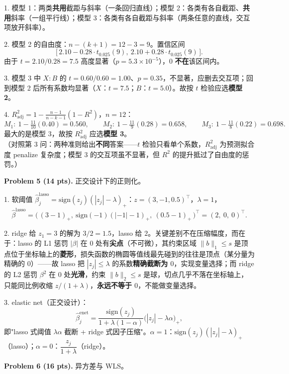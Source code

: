 \documentclass[11pt]{ctexart}
\newcommand{\ans}[1]{{\color{red}#1}}
\begin{document}
\ans{
1. 模型 1：两类\textbf{共用}截距与斜率（一条回归直线）；模型 2：各类有各自截距、\textbf{共用}斜率（一组平行线）；模型 3：各类有各自截距与斜率（两条任意的直线，交互项放开斜率）。

2. 模型 2 的自由度：$n - (k+1) = 12 - 3 = 9$。置信区间
\[
\big[\,2.10 - 0.28 \cdot t_{0.025}(9),\ 2.10 + 0.28 \cdot t_{0.025}(9)\,\big].
\]
由于 $t = 2.10/0.28 = 7.5$ 高度显著（$p = 5.3\times 10^{-5}$），$0$ \textbf{不在}该区间内。

3. 模型 3 中 $X{:}B$ 的 $t = 0.60/0.60 = 1.00$、$p = 0.35$，不显著，应删去交互项；回到模型 2 后所有系数均显著（$X$：$t=7.5$；$B$：$t=5.0$）。故按 $t$ 检验应选\textbf{模型 2}。

4. $R^2_{\mathrm{adj}} = 1 - \frac{n-1}{n-k-1}(1-R^2)$，$n = 12$：
\[
M_1:\ 1 - \tfrac{11}{10}(0.40) = 0.560, \qquad M_2:\ 1 - \tfrac{11}{9}(0.28) = 0.658, \qquad M_3:\ 1 - \tfrac{11}{8}(0.22) = 0.698.
\]
最大的是模型 3，故按 $R^2_{\mathrm{adj}}$ 应选\textbf{模型 3}。\\
（对照第 3 问：两种准则给出\textbf{不同}答案——$t$ 检验只看单个系数，$R^2_{\mathrm{adj}}$ 为预测拟合度 penalize 复杂度；模型 3 的交互项虽不显著，但 $R^2$ 的提升抵过了自由度的惩罚。）
}

\noindent\textbf{Problem 5 (14 pts).} 正交设计下的正则化。

\ans{
1. 软阈值 $\hat\beta_j^{\mathrm{lasso}} = \mathrm{sign}(z_j)(|z_j| - \lambda)_+$：$z = (3, -1, 0.5)^{\top}$，$\lambda = 1$，
\[
\hat\beta^{\mathrm{lasso}} = \big(\,(3-1)_+,\ \mathrm{sign}(-1)(|-1|-1)_+,\ (0.5-1)_+\,\big)^{\top} = (2,\ 0,\ 0)^{\top}.
\]

2. ridge 给 $z_1 = 3$ 的解为 $3/2 = 1.5$，lasso 给 $2$。关键差别不在压缩幅度，而在于：lasso 的 L1 惩罚 $|\beta|$ 在 $0$ 处有\textbf{尖点}（不可微），其约束区域 $\|b\|_1 \leq s$ 是顶点位于坐标轴上的\textbf{菱形}，损失函数的椭圆等值线最先碰到的往往是顶点（某分量为精确的 $0$）——故 lasso 把 $|z_j| \leq \lambda$ 的系数\textbf{精确截断为 $0$}，实现变量选择；而 ridge 的 L2 惩罚 $\beta^2$ 在 $0$ 处\textbf{光滑}，约束 $\|b\|_2 \leq s$ 是球，切点几乎不落在坐标轴上，只能同比例收缩 $z/(1+\lambda)$，\textbf{永远不等于 $0$}，不能做变量选择。

3. elastic net（正交设计）：
\[
\hat\beta_j^{\mathrm{enet}} = \frac{\mathrm{sign}(z_j)}{1 + \lambda(1-\alpha)}\big(|z_j| - \lambda\alpha\big)_+,
\]
即"lasso 式阈值 $\lambda\alpha$ 截断 + ridge 式因子压缩"。$\alpha = 1$：$\mathrm{sign}(z_j)(|z_j|-\lambda)_+$（lasso）；$\alpha = 0$：$\dfrac{z_j}{1+\lambda}$（ridge）。
}

\noindent\textbf{Problem 6 (16 pts).} 异方差与 WLS。
\end{document}
